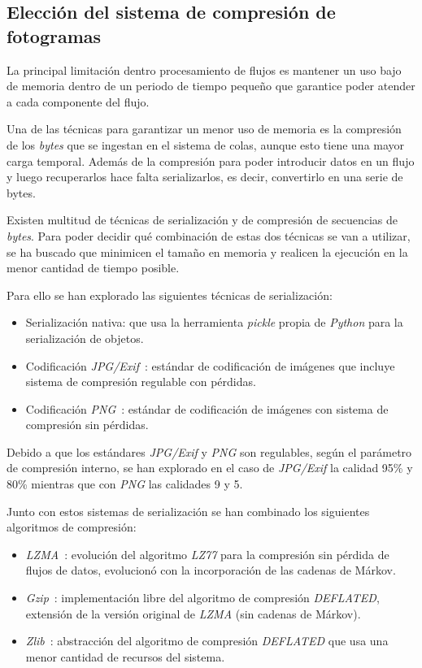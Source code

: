 \subsection{Elección del sistema de compresión de fotogramas}\label{sec:sistemacompresion}

La principal limitación dentro procesamiento de flujos es mantener un uso bajo de memoria dentro de un periodo de tiempo pequeño que garantice poder atender a cada componente del flujo.

Una de las técnicas para garantizar un menor uso de memoria es la compresión de los \textit{bytes} que se ingestan en el sistema de colas, aunque esto tiene una mayor carga temporal. Además de la compresión para poder introducir datos en un flujo y luego recuperarlos hace falta serializarlos, es decir, convertirlo en una serie de bytes.

Existen multitud de técnicas de serialización y de compresión de secuencias de \textit{bytes}. Para poder decidir qué combinación de estas dos técnicas se van a utilizar, se ha buscado que minimicen el tamaño en memoria y realicen la ejecución en la menor cantidad de tiempo posible.

Para ello se han explorado las siguientes técnicas de serialización:

\begin{itemize}
	\item Serialización nativa: que usa la herramienta \textit{pickle} propia de \textit{Python} para la serialización de objetos.
	\item Codificación \textit{JPG/Exif}~\cite{pennebaker1992jpeg}: estándar de codificación de imágenes que incluye sistema de compresión regulable con pérdidas.
	\item Codificación \textit{PNG}~\cite{boutell1997png}: estándar de codificación de imágenes con sistema de compresión sin pérdidas.
\end{itemize}

Debido a que los estándares \textit{JPG/Exif} y \textit{PNG} son regulables, según el parámetro de compresión interno, se han explorado en el caso de \textit{JPG/Exif} la calidad 95\% y 80\% mientras que con \textit{PNG} las calidades 9 y 5.

Junto con estos sistemas de serialización se han combinado los siguientes algoritmos de compresión:

\begin{itemize}
	\item \textit{LZMA}~\cite{tool:pylzma,seroussi1993lempel}: evolución del algoritmo \textit{LZ77} para la compresión sin pérdida de flujos de datos, evolucionó con la incorporación de las cadenas de Márkov.
	\item \textit{Gzip}~\cite{tool:gzip}: implementación libre del algoritmo de compresión \textit{DEFLATED}, extensión de la versión original de \textit{LZMA} (sin cadenas de Márkov).
	\item \textit{Zlib}~\cite{tool:zlib}: abstracción del algoritmo de compresión \textit{DEFLATED} que usa una menor cantidad de recursos del sistema.
\end{itemize}

